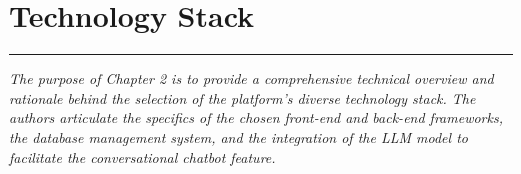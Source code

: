 \chapter {Technology Stack}
\noindent
\rule{\textwidth}{0.4pt}

\begin{center}
\begin{minipage}{0.8\textwidth}
\textit{The purpose of Chapter 2 is to provide a comprehensive technical overview and rationale behind the selection of the platform's diverse technology stack. The authors articulate the specifics of the chosen front-end and back-end frameworks, the database management system, and the integration of the LLM model to facilitate the conversational chatbot feature.}
\end{minipage}
\end{center}



\newpage